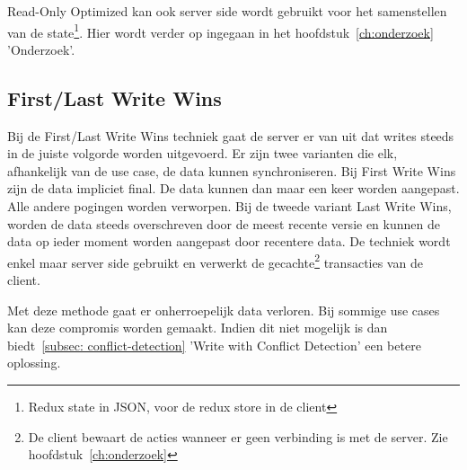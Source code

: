 Read-Only Optimized kan ook server side wordt gebruikt voor het samenstellen van de state\footnote{Redux state in JSON, voor de redux store in de client}. Hier wordt verder op ingegaan in het hoofdstuk~\ref{ch:onderzoek} 'Onderzoek'.

\subsection{First/Last Write Wins}
Bij de First/Last Write Wins techniek gaat de server er van uit dat writes steeds in de juiste volgorde worden uitgevoerd. Er zijn twee varianten die elk, afhankelijk van de use case, de data kunnen synchroniseren. Bij First Write Wins zijn de data impliciet final. De data kunnen dan maar een keer worden aangepast. Alle andere pogingen worden verworpen. Bij de tweede variant Last Write Wins, worden de data steeds overschreven door de meest recente versie en kunnen de data op ieder moment worden aangepast door recentere data. De techniek wordt enkel maar server side gebruikt en verwerkt de gecachte\footnote{De client bewaart de acties wanneer er geen verbinding is met de server. Zie hoofdstuk~\ref{ch:onderzoek}} transacties van de client.

Met deze methode gaat er onherroepelijk data verloren. Bij sommige use cases kan deze compromis worden gemaakt. Indien dit niet mogelijk is dan biedt~\ref{subsec: conflict-detection} 'Write with Conflict Detection' een betere oplossing.


